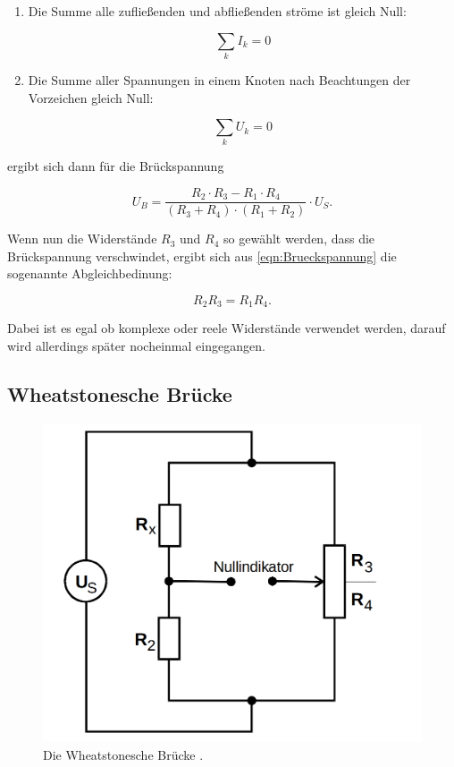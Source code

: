 \begin{enumerate}
    \item Die Summe alle zufließenden und abfließenden ströme ist gleich Null:
    
    \begin{equation}
        \sum_k I_k = 0
    \end{equation}
    \item Die Summe aller Spannungen in einem Knoten nach Beachtungen der Vorzeichen gleich Null:
    
    \begin{equation}
        \sum_k U_k = 0
    \end{equation}
\end{enumerate}

ergibt sich dann für die Brückspannung 

\begin{equation}
    U_B = \frac{R_2\cdot R_3 - R_1 \cdot R_4}{(R_3 + R_4) \cdot (R_1 + R_2)} \cdot U_S .
    \label{eqn:Brueckspannung}
\end{equation}

Wenn nun die Widerstände $R_3$ und $R_4$ so gewählt werden, dass die Brückspannung verschwindet,
ergibt sich aus \eqref{eqn:Brueckspannung} die sogenannte Abgleichbedinung:

\begin{equation}
    R_2 R_3 = R_1 R_4 .
    \label{eqn:abgleich}
\end{equation}

Dabei ist es egal ob komplexe oder reele Widerstände verwendet werden, darauf wird allerdings später nocheinmal eingegangen.

\subsection{Wheatstonesche Brücke}

\begin{figure}
    \centering
    \includegraphics[scale=0.25]{content/Wheatstonesche.png}
    \caption{Die Wheatstonesche Brücke \cite[S. 219]{anleitung}.}
    \label{fig:wheatstonesche}
\end{figure}

